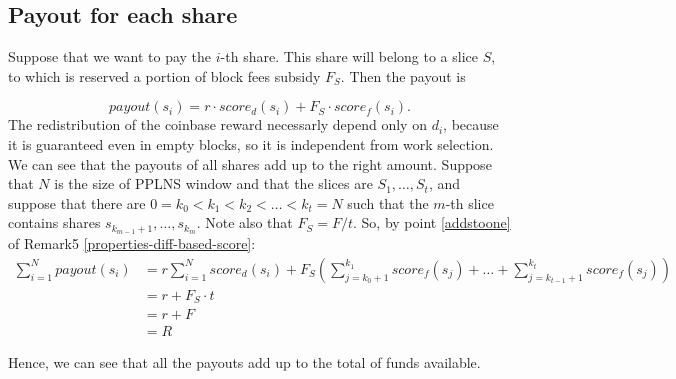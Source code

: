 \documentclass[11pt]{article}
\begin{document}
\subsection{Payout for each share}
Suppose that we want to pay the $i$-th share. This share will belong to a slice $S$, to which is reserved a portion of block fees subsidy $F_S$. Then the payout is

\[payout(s_i) = r\cdot score_d(s_i) + F_S \cdot score_f(s_i).\]
The redistribution of the coinbase reward necessarly depend only on $d_i$, because it is guaranteed even in empty blocks, so it is independent from work selection.
We can see that the payouts of all shares add up to the right amount. Suppose that $N$ is the size of PPLNS window and that the slices are $S_1, \dots, S_t$, and suppose that there are $0=k_0<k_1< k_2< \dots < k_t=N$ such that the $m$-th slice contains shares $s_{k_{m-1}+1}, \dots, s_{k_{m}}$. Note also that $F_S = F/t$. So, by point \ref{addstoone} of Remark5 \ref{properties-diff-based-score}:
\begin{align*}
	\sum_{i=1} ^N payout(s_i) & = r\sum_{i=1}^N score_d(s_i) +F_{S}\left(\sum_{j=k_0+1}^{k_1} score_f(s_j)+\dots +\sum_{j=k_{t-1}+1}^{k_t} score_f(s_j)\right) \\
	                          & = r +F_S\cdot t                                                                                                                \\ &= r+F \\ &= R
\end{align*}

Hence, we can see that all the payouts add up to the total of funds available.
\end{document}
